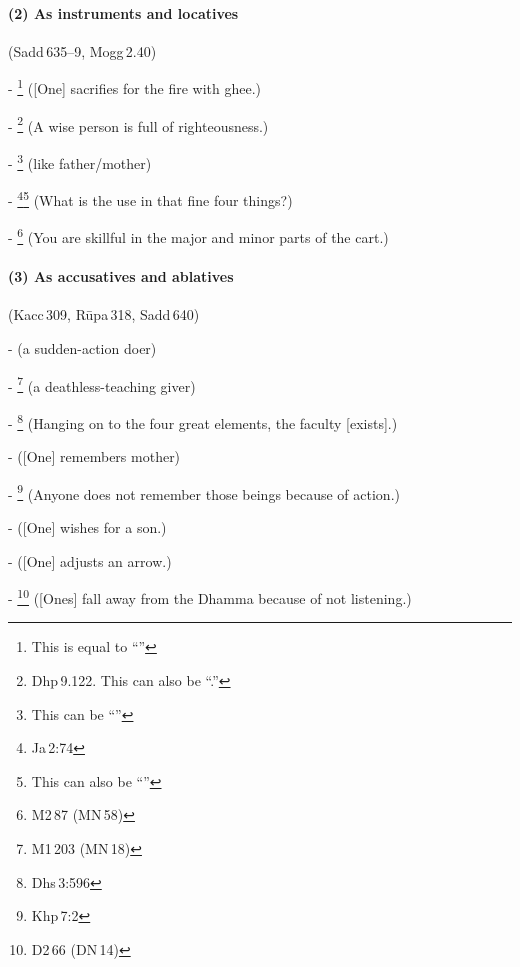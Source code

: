 \paragraph*{(2) As instruments and locatives} (Sadd\,635--9, Mogg\,2.40)\par
- \footnote{This is equal to ``''} ([One] sacrifies for the fire with ghee.)\par
- \footnote{Dhp\,9.122. This can also be ``.''} (A wise person is full of righteousness.)\par
- \footnote{This can be ``''} (like father/mother)\par
- \footnote{Ja\,2:74}\footnote{This can also be ``''} (What is the use in that fine four things?)\par
- \footnote{M2\,87 (MN\,58)} (You are skillful in the major and minor parts of the cart.)\par

\paragraph*{(3) As accusatives and ablatives} (Kacc\,309, R\=upa\,318, Sadd\,640)\par
-  (a sudden-action doer)\par
- \footnote{M1\,203 (MN\,18)} (a deathless-teaching giver)\par
- \footnote{Dhs\,3:596} (Hanging on to the four great elements, the faculty [exists].)\par
-  ([One] remembers mother)\par
- \footnote{Khp\,7:2} (Anyone does not remember those beings because of action.)\par
-  ([One] wishes for a son.)\par
-  ([One] adjusts an arrow.)\par
- \footnote{D2\,66 (DN\,14)} ([Ones] fall away from the Dhamma because of not listening.)\par

